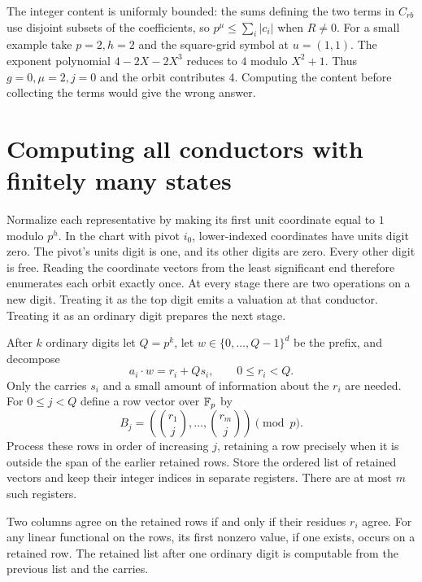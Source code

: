 The integer content is uniformly bounded: the sums defining the two terms in $C_{rb}$ use disjoint subsets of the coefficients, so $p^\mu\le\sum_i|c_i|$ when $R\ne0$. For a small example take $p=2,h=2$ and the square-grid symbol at $u=(1,1)$. The exponent polynomial $4-2X-2X^3$ reduces to $4$ modulo $X^2+1$. Thus $g=0,\mu=2,j=0$ and the orbit contributes $4$. Computing the content before collecting the terms would give the wrong answer.

\section{Computing all conductors with finitely many states}
\label{sec:lucas-machine}

Normalize each representative by making its first unit coordinate
equal to $1$ modulo $p^h$. In the chart with pivot $i_0$, lower-indexed
coordinates have units digit zero. The pivot's units digit is one, and
its other digits are zero. Every other digit is free. Reading the
coordinate vectors from the least significant end therefore
enumerates each orbit exactly once. At every stage there are
two operations on a new digit. Treating it as the top digit
emits a valuation at that conductor. Treating it as an ordinary digit
prepares the next stage.

After $k$ ordinary digits let $Q=p^k$, let $w\in\{0,\ldots,Q-1\}^d$
be the prefix, and decompose
\[
 a_i\cdot w=r_i+Q s_i,\qquad 0\le r_i<Q .
\]
Only the carries $s_i$ and a small amount of information about the $r_i$
are needed. For $0\le j<Q$ define a row vector over $\mathbb F_p$ by
\[
 B_j=\left(\binom{r_1}{j},\ldots,\binom{r_m}{j}\right)\pmod p .
\]
Process these rows in order of increasing $j$, retaining a row precisely
when it is outside the span of the earlier retained rows. Store the
ordered list of retained vectors and keep their integer indices in
separate registers. There are at most $m$ such registers.

\begin{lemma}
\label{lem:lucas-basis}
Two columns agree on the retained rows if and only if their residues
$r_i$ agree. For any linear functional on the rows, its first nonzero
value, if one exists, occurs on a retained row. The retained list after
one ordinary digit is computable from the previous list and the carries.
\end{lemma}

